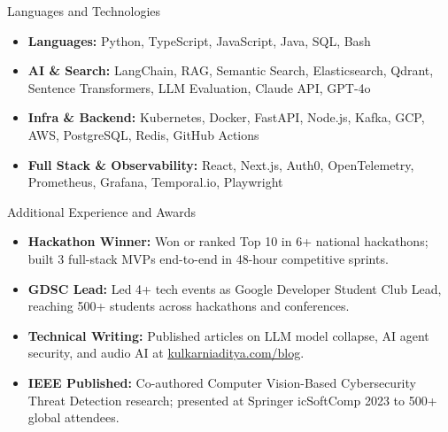 \documentclass[]{mcdowellcv}
\begin{document}
\begin{cvsection}{Languages and Technologies}
  \begin{cvsubsection}{}{}{}
    \begin{itemize}
      \item \textbf{Languages:} Python, TypeScript, JavaScript, Java, SQL, Bash
      \item \textbf{AI \& Search:} LangChain, RAG, Semantic Search, Elasticsearch, Qdrant, Sentence Transformers, LLM Evaluation, Claude API, GPT-4o
      \item \textbf{Infra \& Backend:} Kubernetes, Docker, FastAPI, Node.js, Kafka, GCP, AWS, PostgreSQL, Redis, GitHub Actions
      \item \textbf{Full Stack \& Observability:} React, Next.js, Auth0, OpenTelemetry, Prometheus, Grafana, Temporal.io, Playwright
    \end{itemize}
  \end{cvsubsection}
\end{cvsection}

\begin{cvsection}{Additional Experience and Awards}
  \begin{cvsubsection}{}{}{}
    \begin{itemize}
      \item \textbf{Hackathon Winner:} Won or ranked Top 10 in 6+ national hackathons; built 3 full-stack MVPs end-to-end in 48-hour competitive sprints.
      \item \textbf{GDSC Lead:} Led 4+ tech events as Google Developer Student Club Lead, reaching 500+ students across hackathons and conferences.
      \item \textbf{Technical Writing:} Published articles on LLM model collapse, AI agent security, and audio AI at \href{https://www.kulkarniaditya.com/blog}{kulkarniaditya.com/blog}.
      \item \textbf{IEEE Published:} Co-authored Computer Vision-Based Cybersecurity Threat Detection research; presented at Springer icSoftComp 2023 to 500+ global attendees.
    \end{itemize}
  \end{cvsubsection}
\end{cvsection}
\end{document}
